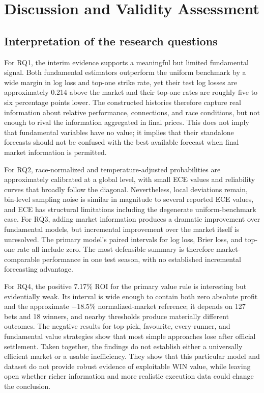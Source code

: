 \section{Discussion and Validity Assessment}\label{sec:discussion}

\subsection{Interpretation of the research questions}\label{sec:discussion-rq}
For RQ1, the interim evidence supports a meaningful but limited fundamental signal. Both fundamental estimators outperform the uniform benchmark by a wide margin in log loss and top-one strike rate, yet their test log losses are approximately 0.214 above the market and their top-one rates are roughly five to six percentage points lower. The constructed histories therefore capture real information about relative performance, connections, and race conditions, but not enough to rival the information aggregated in final prices. This does not imply that fundamental variables have no value; it implies that their standalone forecasts should not be confused with the best available forecast when final market information is permitted.

For RQ2, race-normalized and temperature-adjusted probabilities are approximately calibrated at a global level, with small ECE values and reliability curves that broadly follow the diagonal. Nevertheless, local deviations remain, bin-level sampling noise is similar in magnitude to several reported ECE values, and ECE has structural limitations including the degenerate uniform-benchmark case. For RQ3, adding market information produces a dramatic improvement over fundamental models, but incremental improvement over the market itself is unresolved. The primary model's paired intervals for log loss, Brier loss, and top-one rate all include zero. The most defensible summary is therefore market-comparable performance in one test season, with no established incremental forecasting advantage.

For RQ4, the positive 7.17\% ROI for the primary value rule is interesting but evidentially weak. Its interval is wide enough to contain both zero absolute profit and the approximate $-18.5\%$ normalized-market reference; it depends on 127 bets and 18 winners, and nearby thresholds produce materially different outcomes. The negative results for top-pick, favourite, every-runner, and fundamental value strategies show that most simple approaches lose after official settlement. Taken together, the findings do not establish either a universally efficient market or a usable inefficiency. They show that this particular model and dataset do not provide robust evidence of exploitable WIN value, while leaving open whether richer information and more realistic execution data could change the conclusion.


